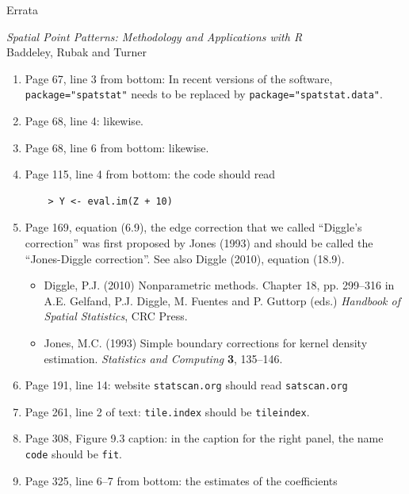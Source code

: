 \documentclass[12pt,a4paper]{article}
\begin{document}
\thispagestyle{empty}
\begin{center}
  \begin{LARGE}
    Errata 
  \end{LARGE}

  \begin{large}
    \emph{Spatial Point Patterns: Methodology and Applications with R}\\
    Baddeley, Rubak and Turner
  \end{large}
\end{center}

\begin{enumerate}
\item Page 67, line 3 from bottom: In recent versions of the software,
  \texttt{package="spatstat"} needs to be replaced by
  \texttt{package="spatstat.data"}.
\item Page 68, line 4: likewise.
\item Page 68, line 6 from bottom: likewise.
\item Page 115, line 4 from bottom: the code should read
\begin{verbatim}
    > Y <- eval.im(Z + 10)
\end{verbatim}
\item Page 169, equation (6.9), the edge correction that we called
  ``Diggle's correction'' was first proposed by Jones (1993)
  and should be called the ``Jones-Diggle correction''.
  See also Diggle (2010), equation (18.9).
\begin{small}
  \begin{itemize}
  \item
    Diggle, P.J. (2010)
    Nonparametric methods.
    Chapter 18, pp. 299--316 in
    A.E. Gelfand, P.J. Diggle, M. Fuentes and P. Guttorp (eds.)
    \emph{Handbook of Spatial Statistics}, CRC Press.
  \item  Jones, M.C. (1993)
    Simple boundary corrections for kernel density estimation.
    \emph{Statistics and Computing} \textbf{3}, 135--146.
  \end{itemize}
\end{small}
\item Page 191, line 14: 
 website \texttt{statscan.org} should read \texttt{satscan.org}
\item Page 261, line 2 of text: 
\texttt{tile.index} should be \texttt{tileindex}.
\item Page 308, Figure 9.3 caption: in the caption for the right panel,
the name \texttt{code} should be \texttt{fit}.
\item Page 325, line 6--7 from bottom: the estimates of the coefficients

\end{enumerate}
\end{document}
